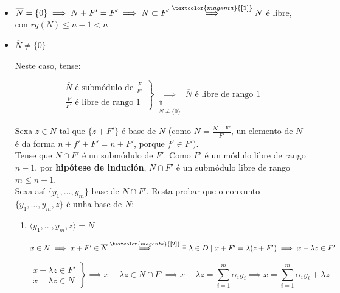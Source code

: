 \documentclass[twoside]{report}
\newcommand{\magbf}[1]{\textcolor{magenta}{\textbf{#1}}} %
\theoremstyle{mystyle}
\begin{document}
\begin{itemize}
    \item $\overline{N} = \{0\} \implies N + F' = F' \implies N \subset F' \overset{\magbf{[1]}}{\implies} N$ é libre, con $rg(N) \leq n -1 < n$
    \item $\overline{N} \neq \{0\}$
    
    Neste caso, tense:
    
    \[ 
    \left. \begin{array}{r} 
    \overline{N} \text{ é submódulo de } \displaystyle \frac{F}{F'}\\[1ex]
    \displaystyle \frac{F}{F'} \text{ é libre de rango } 1
    \end{array} \right\}
    \underset{\substack{\Uparrow \\ \overline{N} \neq \{0\}}}{\implies} 
    \overline{N} \text{ é libre de rango 1}
    \]   
    
    \vspace{3mm}
    
    Sexa $z \in N$ tal que $\{z + F'\}$ é base de $\overline{N}$ (como $\overline{N} = \displaystyle \frac{N + F'}{F'}$, un elemento de $\overline{N}$ é da forma $n + f' + F' = n + F'$, porque $f' \in F')$.\\
    
    Tense que $N \cap F'$ é un submódulo de $F'$. Como $F'$ é un módulo libre de rango $n-1$, por \textbf{hipótese de indución}, $N \cap F'$ é un submódulo libre de rango $m \leq n-1$.\\
    
    Sexa así $\{y_{1}, \dots, y_{m}\}$ base de $N \cap F'$. Resta probar que o conxunto $\{y_{1}, \dots, y_{m}, z\}$ é unha base de $N$:
    
    \begin{enumerate}
        \item $\langle y_{1}, \dots, y_{m}, z \rangle = N$
        
        $x \in N \implies x + F' \in \overline{N} \overset{\magbf{[2]}}{\implies} \exists \hspace{1mm} \lambda \in D \hspace{1mm} | \hspace{1mm} x + F' = \lambda(z + F') \implies x - \lambda z \in F'$
        
            \[ 
            \left. \begin{array}{r} 
            x - \lambda z \in F'\\[1ex]
            x - \lambda z \in N
            \end{array} \right\}
            \implies x - \lambda z \in N \cap F' \implies x - \lambda z = \displaystyle \sum_{i = 1}^{m}{\alpha_{i}y_{i}} \implies x = \displaystyle \sum_{i = 1}^{m}{\alpha_{i}y_{i}} + \lambda z
            \]   
        

\end{enumerate}
\end{itemize}
\end{document}
